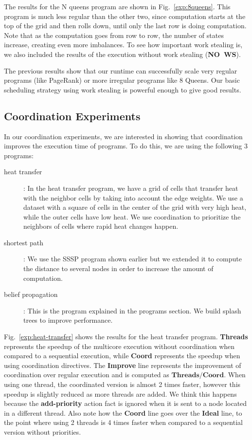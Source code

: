 The results for the N queens program are shown in Fig.~\ref{exp:8queens}. This program is much less regular than the other two, since computation starts at the top of the grid and then rolls down, until only the last row is doing computation. Note that as the computation goes from row to row, the number of states increase, creating even more imbalances. To see how important work stealing is, we also included the results of the execution without work stealing (\textbf{NO~WS}).

The previous results show that our runtime can successfully scale very regular programs (like PageRank) or more irregular programs like 8 Queens. Our basic
scheduling strategy using work stealing is powerful enough to give good results.

\subsection{Coordination Experiments}

In our coordination experiments, we are interested in showing that coordination improves the execution time of programs.
To do this, we are using the following 3 programs:

\begin{description}
   \item[heat transfer]: In the heat transfer program, we have a grid of cells that transfer heat with the neighbor cells by taking into account the edge weights. We use a dataset with a square of cells in the center of the grid with very high heat, while the outer cells have low heat. We use coordination to prioritize the neighbors of cells where rapid heat changes happen.
   \item[shortest path]: We use the SSSP program shown earlier but we extended it to compute the distance to several nodes in order to increase the amount of computation.
   \item[belief propagation]: This is the program explained in the programs section. We build splash trees to improve performance.
\end{description}

Fig.~\ref{exp:heat-transfer} shows the results for the heat transfer program. \textbf{Threads} represents the speedup of the multicore execution
without coordination when compared to a sequential execution, while \textbf{Coord} represents the speedup when using coordination directives. The
\textbf{Improve} line represents the improvement of coordination over regular execution and is computed as $\mathbf{Threads} / \mathbf{Coord}$.
When using one thread, the coordinated version is almost 2 times
faster, however this speedup is slightly reduced as more threads are added. We think this happens because the \textbf{add-priority} action fact is ignored
when it is sent to a node located in a different thread.
Also note how the \textbf{Coord} line goes over the \textbf{Ideal} line, to the point where using 2 threads is 4 times faster when compared to a sequential
version without priorities.

